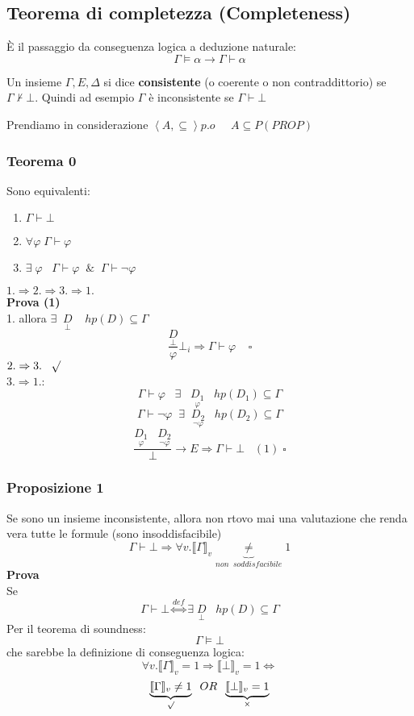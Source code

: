 \documentclass{article}
\theoremstyle{break}
\theoremstyle{break}
\theoremstyle{break}
\theoremstyle{break}
\begin{document}
\subsection{Teorema di completezza (Completeness)}
È il passaggio da conseguenza logica a deduzione naturale: 
\[
  \Gamma \models \alpha \to  \Gamma \vdash \alpha 
\] 
\begin{definition}
  Un insieme \( \Gamma, E, \Delta \) si dice \textbf{consistente} (o coerente o non contraddittorio)
  se \( \Gamma \not\vdash \bot \). Quindi ad esempio \( \Gamma \) è inconsistente se
  \( \Gamma \vdash \bot \) 
\end{definition}
Prendiamo in considerazione \(\left<A, \subseteq\right> p.o\;\;\;\;\; A \subseteq P(PROP) \) 
\subsubsection{Teorema 0}
Sono equivalenti:
\begin{enumerate}
  \item \( \Gamma \vdash \bot \) 
  \item \( \forall \varphi \; \Gamma \vdash \varphi \) 
  \item \( \exists \; \varphi\;\;\; \Gamma \vdash \varphi\;\; \&\;\; \Gamma \vdash \neg \varphi \) 
\end{enumerate}
\( 1. \Rightarrow 2. \Rightarrow 3. \Rightarrow 1. \)\\
\textbf{Prova (1)}\\
1. allora \( \exists\;\; \underset{\bot}{D} \;\;\;\; hp(D) \subseteq \Gamma \) 
\[
  \frac{\underset{\bot}{D}}{\varphi}\bot_i \Rightarrow \Gamma \vdash \varphi \;\;\;\; \square
\] 
\( 2. \Rightarrow 3.\;\;\; \surd \)\\
\( 3. \Rightarrow 1. \):
\[
  \Gamma \vdash \varphi\;\;\; \exists \;\;\; \underset{\varphi}{D_1} \;\;\; hp(D_1) \subseteq \Gamma
\] 
\[
  \Gamma \vdash \neg \varphi \;\; \exists  \;\; \underset{\neg \varphi}{D_2} \;\;\; hp(D_2) \subseteq \Gamma
\] 
\[
  \frac{\underset{\varphi}{D_1}\;\;\;\underset{\neg \varphi}{D_2}}{\bot} \to E \Rightarrow \Gamma \vdash \bot \;\;\; (1)\; \square
\] 
\subsubsection{Proposizione 1}
Se sono un insieme inconsistente, allora non rtovo mai una valutazione che renda vera tutte le formule (sono insoddisfacibile)
\[
  \Gamma \vdash \bot \Rightarrow \forall v. \llbracket \Gamma\rrbracket_v \underbrace{\neq}_{non\;\; soddisfacibile} 1
\] 
\textbf{Prova}\\
Se
\[
  \Gamma \vdash \bot \stackrel{def}{\Leftrightarrow} \exists \;\underset{\bot}{D} \;\;\; hp(D) \subseteq \Gamma
\] 
Per il teorema di soundness:
\[
  \Gamma \models \bot
\] 
che sarebbe la definizione di conseguenza logica:
\[
  \forall v. \llbracket \Gamma\rrbracket_v=1 \Rightarrow \llbracket \bot\rrbracket_v=1 \Leftrightarrow
\] 
\[
  \underbrace{\llbracket \Gamma\rrbracket_v \neq 1}_{\surd} \;\;OR\;\; \underbrace{\llbracket \bot\rrbracket_v=1}_{\times }
\] 
\end{document}
